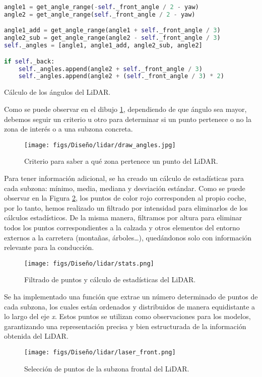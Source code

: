 \begin{code}[h]
\begin{lstlisting}[language=Python]
angle1 = get_angle_range(-self._front_angle / 2 - yaw)
angle2 = get_angle_range(self._front_angle / 2 - yaw)

angle1_add = get_angle_range(angle1 + self._front_angle / 3)
angle2_sub = get_angle_range(angle2 - self._front_angle / 3)        
self._angles = [angle1, angle1_add, angle2_sub, angle2]

if self._back:
	self._angles.append(angle2 + self._front_angle / 3)
	self._angles.append(angle2 + (self._front_angle / 3) * 2)
\end{lstlisting}
\caption[Cálculo de los ángulos de la zona del \ac{LiDAR}]{Cálculo de los ángulos del \ac{LiDAR}.}
\label{cod:angle_lidar}
\end{code}

\newpage

Como se puede observar en el dibujo \ref{fig:dib_angle}, dependiendo de que ángulo sea mayor, debemos seguir un criterio u otro para determinar si un punto pertenece o no la zona de interés o a una subzona concreta.
\begin{figure}[ht]
  \centering
  \texttt{[image: figs/Diseño/lidar/draw\_angles.jpg]}
  \caption{Criterio para saber a qué zona pertenece un punto del \ac{LiDAR}.}
  \label{fig:dib_angle}
\end{figure}

Para tener información adicional, se ha creado un cálculo de estadísticas para cada subzona: mínimo, media, mediana y desviación estándar. Como se puede observar en la Figura \ref{fig:stats_lidar}, los puntos de color rojo corresponden al propio coche, por lo tanto, hemos realizado un filtrado por intensidad para eliminarlos de los cálculos estadísticos. De la misma manera, filtramos por altura para eliminar todos los puntos correspondientes a la calzada y otros elementos del entorno externos a la carretera (montañas, árboles…), quedándonos solo con información relevante para la conducción.
\begin{figure}[ht]
  \centering
  \texttt{[image: figs/Diseño/lidar/stats.png]}
  \caption{Filtrado de puntos y cálculo de estadísticas del \ac{LiDAR}.}
  \label{fig:stats_lidar}
\end{figure}

\newpage

Se ha implementado una función que extrae un número determinado de puntos de cada subzona, los cuales están ordenados y distribuidos de manera equidistante a lo largo del eje \textit{x}. Estos puntos se utilizan como observaciones para los modelos, garantizando una representación precisa y bien estructurada de la información obtenida del \ac{LiDAR}.
\begin{figure}[ht]
\centering
\texttt{[image: figs/Diseño/lidar/laser\_front.png]}
\caption{Selección de puntos de la subzona frontal del \ac{LiDAR}.}
\label{fig:laser_front}
\end{figure}

